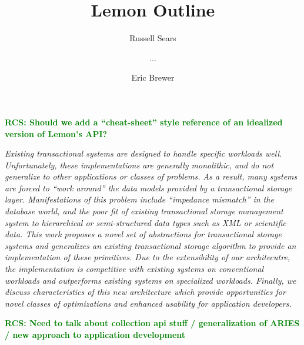 \documentclass[letterpaper,twocolumn,english]{article}
\newcommand{\yad}{Lemon\xspace}
\newcommand{\rcs}[1]{\textcolor{green}{\bf RCS: #1}}
\begin{document}
\title{\yad Outline }


\author{Russell Sears \and ... \and Eric Brewer}

\maketitle



\rcs{Should we add a
``cheat-sheet'' style reference of an idealized version of \yad's
API?}
\vspace*{6pt}

{\em Existing transactional systems are designed to handle specific
workloads well.  Unfortunately, these implementations are generally
monolithic, and do not generalize to other applications or classes of
problems.  As a result, many systems are forced to ``work around'' the
data models provided by a transactional storage layer. Manifestations
of this problem include ``impedance mismatch'' in the database world,
and the poor fit of existing transactional storage management system
to hierarchical or semi-structured data types such as XML or
scientific data.  This work proposes a novel set of abstractions for
transactional storage systems and generalizes an existing
transactional storage algorithm to provide an implementation of these
primitives.  Due to the extensibility of our architecutre, the
implementation is competitive with existing systems on conventional
workloads and outperforms existing systems on specialized
workloads.  Finally, we discuss characteristics of this new
architecture which provide opportunities for novel classes of
optimizations and enhanced usability for application developers.}

\rcs{Need to talk about collection api stuff / generalization of ARIES
/ new approach to application development}

\end{document}
